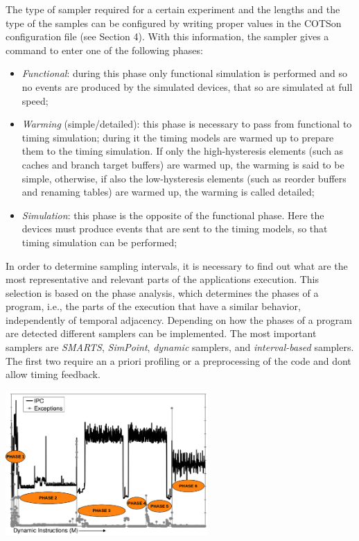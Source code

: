 \documentclass[a4paper]{article}
\begin{document}
{
The type of sampler required for a certain experiment and the lengths
and the type of the samples can be configured by writing proper values
in the COTSon configuration file (see Section 4). With this
information, the sampler gives a command to enter one of the following
phases:}

\begin{itemize}
\item {
\textit{Functional}: during this phase only functional simulation is
performed and so no events are produced by the simulated devices, that
so are simulated at full speed;}
\item {
\textit{Warming} (simple/detailed): this phase is necessary to pass from
functional to timing simulation; during it the timing models are warmed
up to prepare them to the timing simulation. If only the
high-hysteresis elements (such as caches and branch target buffers) are
warmed up, the warming is said to be simple, otherwise, if also the
low-hysteresis elements (such as reorder buffers and renaming tables)
are warmed up, the warming is called detailed;}
\item {
\textit{Simulation}: this phase is the opposite of the functional phase.
Here the devices must produce events that are sent to the timing
models, so that timing simulation can be performed;}
\end{itemize}
{
In order to determine sampling intervals, it is necessary to find out
what are the most representative and relevant parts of the
application{\textquotesingle}s execution. This selection is based on
the phase analysis, which determines the phases of a program, i.e., the
parts of the execution that have a similar behavior, independently of
temporal adjacency. Depending on how the phases of a program are
detected different samplers can be implemented. The most important
samplers are \textit{SMARTS}, \textit{SimPoint}, \textit{dynamic
}samplers, and \textit{interval-based} samplers. The first two require
an a priori profiling or a preprocessing of the code and
don{\textquotesingle}t allow timing feedback. }

{\centering 
\includegraphics[width=3.0465in,height=2.1654in]{img6.png}
\par}
\end{document}
